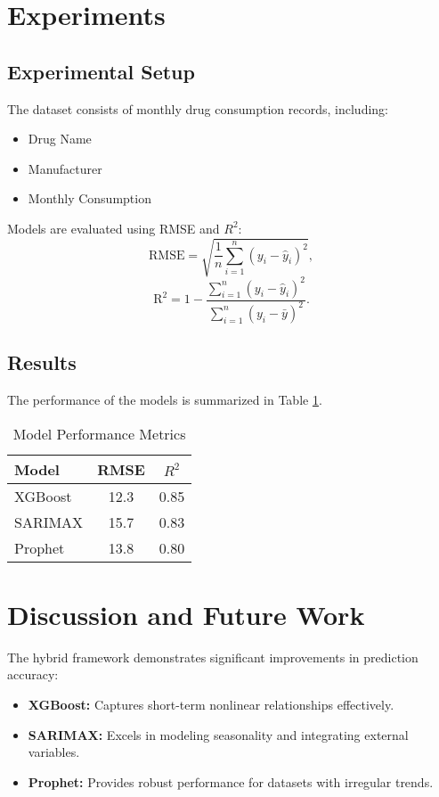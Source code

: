\documentclass[conference]{IEEEtran}
\begin{document}
\section{Experiments}

\subsection{Experimental Setup}
The dataset consists of monthly drug consumption records, including:
\begin{itemize}
    \item Drug Name
    \item Manufacturer
    \item Monthly Consumption
\end{itemize}

Models are evaluated using RMSE and \( R^2 \):
\begin{equation}
\text{RMSE} = \sqrt{\frac{1}{n} \sum_{i=1}^n \left( y_i - \hat{y}_i \right)^2},
\end{equation}
\begin{equation}
\text{R}^2 = 1 - \frac{\sum_{i=1}^n \left( y_i - \hat{y}_i \right)^2}{\sum_{i=1}^n \left( y_i - \bar{y} \right)^2}.
\end{equation}

\subsection{Results}
The performance of the models is summarized in Table \ref{table:performance}.
\begin{table}[H]
\caption{Model Performance Metrics}
\label{table:performance}
\centering
\begin{tabular}{|l|c|c|}
\hline
\textbf{Model} & \textbf{RMSE} & \textbf{\( R^2 \)} \\ \hline
XGBoost        & 12.3          & 0.85              \\ \hline
SARIMAX        & 15.7          & 0.83              \\ \hline
Prophet        & 13.8          & 0.80              \\ \hline
\end{tabular}
\end{table}

\section{Discussion and Future Work}
The hybrid framework demonstrates significant improvements in prediction accuracy:
\begin{itemize}
    \item \textbf{XGBoost:} Captures short-term nonlinear relationships effectively.
    \item \textbf{SARIMAX:} Excels in modeling seasonality and integrating external variables.
    \item \textbf{Prophet:} Provides robust performance for datasets with irregular trends.
\end{itemize}
\end{document}
